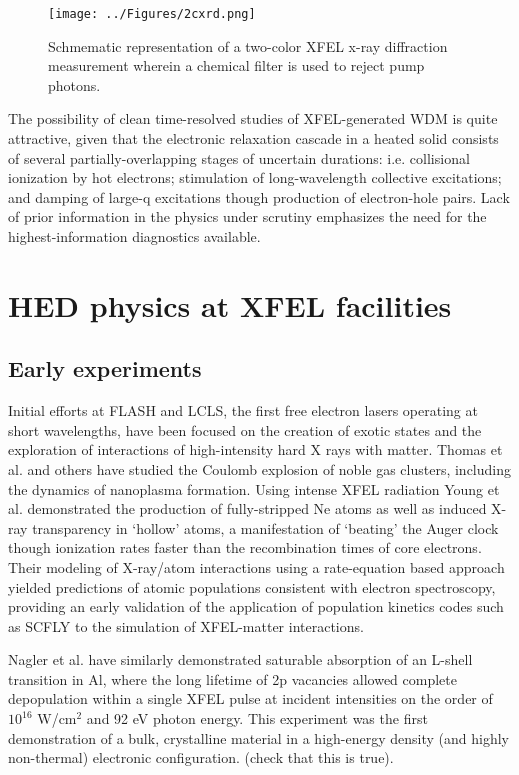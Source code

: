 \documentclass [11pt, proquest, article] {uwthesis}[2016/11/22]
\begin{document}
\begin{figure}[h] 
\caption{Schmematic representation of a two-color XFEL x-ray diffraction measurement wherein a chemical filter is used to reject pump photons.}
\label{2cxrd}
\centering
\texttt{[image: ../Figures/2cxrd.png]}
\end{figure}


The possibility of clean time-resolved studies of XFEL-generated WDM is quite attractive, given that the electronic relaxation cascade in a heated solid consists of several partially-overlapping stages of uncertain durations: i.e. collisional ionization by hot electrons; stimulation of long-wavelength collective excitations; and damping of large-q excitations though production of electron-hole pairs. Lack of prior information in the physics under scrutiny emphasizes the need for the highest-information diagnostics available.

\section{HED physics at XFEL facilities}
\subsection{Early experiments}
Initial efforts at FLASH and LCLS, the first free electron lasers operating at short wavelengths, have been focused on the creation of exotic states and the exploration of interactions of high-intensity hard X rays with matter. Thomas et al. and others have studied the Coulomb explosion of noble gas clusters, including the dynamics of nanoplasma formation.\cite{thomas2009shell} Using intense XFEL radiation Young et al. demonstrated the production of fully-stripped Ne atoms as well as induced X-ray transparency in `hollow' atoms, a manifestation of `beating' the Auger clock though ionization rates faster than the recombination times of core electrons. Their modeling of X-ray/atom interactions using a rate-equation based approach yielded predictions of atomic populations consistent with electron spectroscopy, providing an early validation of the application of population kinetics codes such as SCFLY to the simulation of XFEL-matter interactions.%


Nagler et al. have similarly demonstrated saturable absorption of an L-shell transition in Al, where the long lifetime of 2p vacancies allowed complete depopulation within a single XFEL pulse at incident intensities on the order of $10^{16}$ W/cm$^2$ and 92 eV photon energy.\cite{nagler2009turning} This experiment was the first demonstration of a bulk, crystalline material in a high-energy density (and highly non-thermal) electronic configuration. (check that this is true). 
\end{document}
